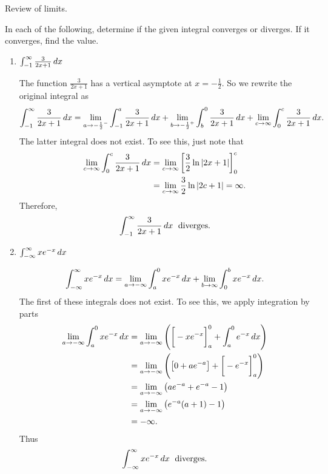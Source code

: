 \documentclass[handout]{ximera}
\begin{document}
\begin{instructorNotes}
Review of limits.
\end{instructorNotes}








\begin{problem}
In each of the following, determine if the given integral converges or diverges.  
If it converges, find the value.

	\begin{enumerate}
	
	\item  $\int_{-1}^{\infty} \frac{3}{2x+1} \,d x$
	\begin{freeResponse}
	The function $\frac{3}{2x+1}$ has a vertical asymptote at $x=- \frac{1}{2}$.  
	So we rewrite the original integral as
		\[
		\int_{-1}^{\infty} \frac{3}{2x+1} \,d x = \lim_{a \to -\frac{1}{2}^-} \int_{-1}^a \frac{3}{2x+1} \,d x  
		+ \lim_{b \to -\frac{1}{2}^+} \int_b^0 \frac{3}{2x+1} \,d x + \lim_{c \to \infty} \int_0^c \frac{3}{2x+1} \,d x.
		\]
	The latter integral does not exist.  
	To see this, just note that
		\begin{align*}
		 \lim_{c \to \infty} \int_0^c \frac{3}{2x+1} \,d x 
		 &= \lim_{c \to \infty} \bigg[ \frac{3}{2} \ln|2x+1| \bigg]_0^c  \\
		 &= \lim_{c \to \infty} \frac{3}{2} \ln|2c+1| = \infty.
		\end{align*}
	Therefore, 
		\[
		\int_{-1}^{\infty} \frac{3}{2x+1} \,d x \; \text{ diverges.}
		\]
	\end{freeResponse}
	
	
	
	\item  $\int_{-\infty}^{\infty} x e^{-x} \,d x$
	\begin{freeResponse}
	\[
	\int_{-\infty}^{\infty} x e^{-x} \,d x = \lim_{a \to -\infty} \int_a^0 xe^{-x} \,d x + \lim_{b \to \infty} \int_0^b xe^{-x} \,d x.
	\]
	The first of these integrals does not exist.  
	To see this, we apply integration by parts
		\begin{align*}
		\lim_{a \to -\infty} \int_a^0 xe^{-x} \,d x
		&= \lim_{a \to -\infty} \left( \bigg[ -xe^{-x} \bigg]_a^0 + \int_a^0 e^{-x} \,d x \right)  \\
		&= \lim_{a \to -\infty} \left( \left[ 0 + ae^{-a} \right] + \bigg[ -e^{-x} \bigg]_a^0 \right)  \\
		&= \lim_{a \to -\infty} \left( ae^{-a} + e^{-a} - 1 \right)  \\
		&= \lim_{a \to -\infty} \left( e^{-a}(a+1) - 1 \right)  \\
		&= - \infty.
		\end{align*}
	Thus
		\[
		\int_{-\infty}^{\infty} x e^{-x} \,d x \; \text{ diverges.}
		\]
	\end{freeResponse}
	

\end{enumerate}
\end{problem}
\end{document}
